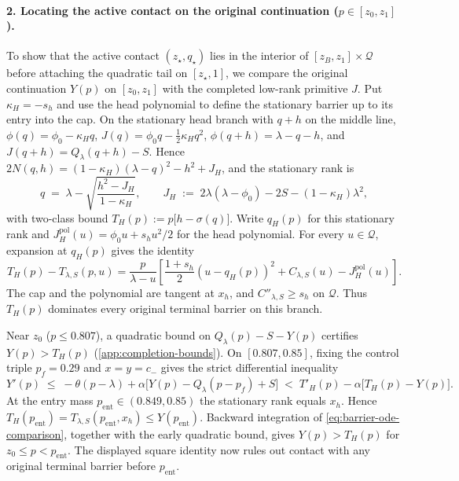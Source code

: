 \documentclass[11pt]{article}
\numberwithin{equation}{section}
\theoremstyle{plain}
\theoremstyle{definition}
\newcommand{\1}{\mathbf{1}}
\newcommand{\calQ}{\mathcal{Q}}
\begin{document}
\paragraph{2. Locating the active contact on the original continuation ($p \in [z_0, z_1]$).}
To show that the active contact $(z_\star, q_\star)$ lies in the interior of $[z_B, z_1] \times \calQ$ before attaching the quadratic tail on $[z_\star, 1]$, we compare the original continuation $Y(p)$ on $[z_0, z_1]$ with the completed low-rank primitive $J$. Put $\kappa_H=-s_h$ and use the head polynomial to define the stationary barrier up to its entry into the cap. On the stationary head branch with $q+h$ on the middle line, $\phi(q)=\phi_0-\kappa_H q$, $J(q) = \phi_0 q - \frac{1}{2}\kappa_H q^2$, $\phi(q + h) = \lambda - q - h$, and $J(q+h)=Q_\lambda(q+h)-S$. Hence $2N(q,h)=(1-\kappa_H)(\lambda-q)^2-h^2+J_H$, and the stationary rank is
\[
  q \;=\; \lambda - \sqrt{\frac{h^2 - J_H}{1 - \kappa_H}},
  \qquad
  J_H \;:=\; 2\lambda(\lambda - \phi_0) - 2S - (1 - \kappa_H)\lambda^2,
\]
with two-class bound $T_H(p) := p\bigl[h - \sigma(q)\bigr]$. Write $q_H(p)$ for this stationary rank and $J_H^{\mathrm{pol}}(u)=\phi_0u+s_hu^2/2$ for the head polynomial. For every $u\in\calQ$, expansion at $q_H(p)$ gives the identity
\[
 T_H(p)-T_{\lambda,S}(p,u)=\frac{p}{\lambda-u}
 \left[\frac{1+s_h}{2}(u-q_H(p))^2+C_{\lambda,S}(u)-J_H^{\mathrm{pol}}(u)\right].
\]
The cap and the polynomial are tangent at $x_h$, and $C''_{\lambda,S}\ge s_h$ on $\calQ$. Thus $T_H(p)$ dominates every original terminal barrier on this branch.

Near $z_0$ ($p \le 0.807$), a quadratic bound on $Q_\lambda(p) - S - Y(p)$ certifies $Y(p) > T_H(p)$ (\cref{app:completion-bounds}). On $[0.807, 0.85]$, fixing the control triple $p_f = 0.29$ and $x = y = c_-$ gives the strict differential inequality
\begin{equation}
  Y'(p) \;\le\; -\theta(p - \lambda) + \alpha\bigl[Y(p) - Q_\lambda(p - p_f) + S\bigr] \;<\; T'_H(p) - \alpha\bigl[T_H(p) - Y(p)\bigr].
  \label{eq:barrier-ode-comparison}
\end{equation}
At the entry mass $p_{\mathrm{ent}}\in(0.849,0.85)$ the stationary rank equals $x_h$. Hence $T_H(p_{\mathrm{ent}})=T_{\lambda,S}(p_{\mathrm{ent}},x_h)\le Y(p_{\mathrm{ent}})$. Backward integration of \cref{eq:barrier-ode-comparison}, together with the early quadratic bound, gives $Y(p)>T_H(p)$ for $z_0\le p<p_{\mathrm{ent}}$. The displayed square identity now rules out contact with any original terminal barrier before $p_{\mathrm{ent}}$.
\end{document}
